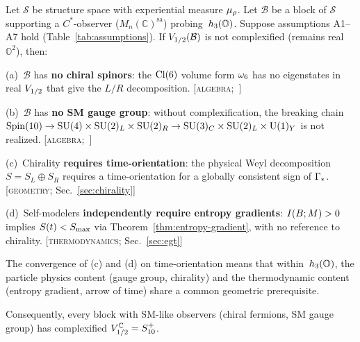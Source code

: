 \begin{theorem}
\label{thm:complexification}
Let $\mathcal{S}$ be structure space with experiential measure
$\mu_{\rho}$.  Let $\mathcal{B}$ be a block of $\mathcal{S}$
supporting a $C^*$-observer ($M_n(\mathbb{C})^{\mathrm{sa}}$)
probing~$h_3(\mathbb{O})$.  Suppose assumptions A1--A7 hold
\textup{(Table~\ref{tab:assumptions})}.  If
$V_{1/2}(\mathcal{B})$ is not complexified
\textup{(}remains real $\mathbb{O}^2$\textup{)}, then:

\smallskip\noindent
\textup{(a)}~$\mathcal{B}$ has \textbf{no chiral spinors}: the
$\mathrm{Cl}(6)$ volume form $\omega_6$ has no eigenstates in real
$V_{1/2}$ that give the $L/R$
decomposition.
\hfill\textup{[\textsc{algebra};~\cite{Paper7}]}

\smallskip\noindent
\textup{(b)}~$\mathcal{B}$ has \textbf{no SM gauge group}: without
complexification, the breaking chain
$\mathrm{Spin}(10) \to \mathrm{SU}(4) \times \mathrm{SU}(2)_L \times \mathrm{SU}(2)_R \to \mathrm{SU}(3)_C \times \mathrm{SU}(2)_L \times \mathrm{U}(1)_Y$ is not
realized.
\hfill\textup{[\textsc{algebra};~\cite{Paper7}]}

\smallskip\noindent
\textup{(c)}~Chirality \textbf{requires time-orientation}: the
physical Weyl decomposition $S = S_L \oplus S_R$ requires a
time-orientation for a globally consistent sign of
$\Gamma_*$.
\hfill\textup{[\textsc{geometry}; Sec.~\ref{sec:chirality}]}

\smallskip\noindent
\textup{(d)}~Self-modelers \textbf{independently require entropy
gradients}: $I(B;M) > 0$ implies $S(t) < S_{\max}$ via
Theorem~\ref{thm:entropy-gradient}, with no reference to
chirality.
\hfill\textup{[\textsc{thermodynamics}; Sec.~\ref{sec:egt}]}

\smallskip\noindent
The convergence of \textup{(c)} and \textup{(d)} on
time-orientation means that within~$h_3(\mathbb{O})$, the particle physics
content \textup{(}gauge group, chirality\textup{)} and the
thermodynamic content \textup{(}entropy gradient, arrow of
time\textup{)} share a common geometric prerequisite.

\smallskip\noindent
Consequently, every block with SM-like observers \textup{(}chiral
fermions, SM gauge group\textup{)} has complexified
$V_{1/2}^{\mathbb{C}} = S_{10}^+$.
\end{theorem}

